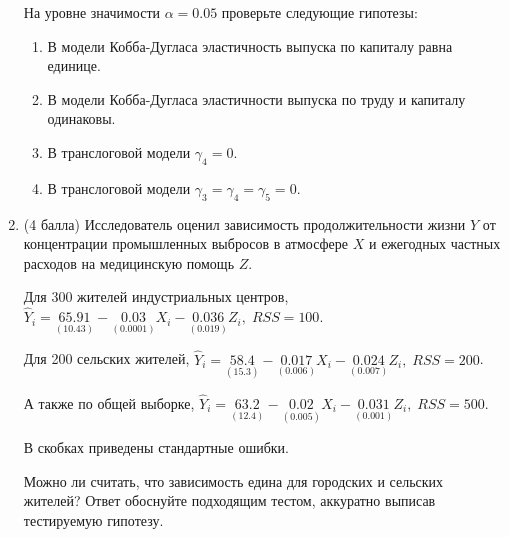 \documentclass[12pt]{article}
\theoremstyle{definition}
\begin{document}
\begin{enumerate}


На уровне значимости $\alpha = 0.05$ проверьте следующие гипотезы:
\begin{enumerate}
\item В модели Кобба-Дугласа эластичность выпуска по капиталу равна единице.
\item В модели Кобба-Дугласа эластичности выпуска по труду и капиталу одинаковы.
\item В транслоговой модели $\gamma_4=0$.
\item В транслоговой модели $\gamma_3 = \gamma_4 = \gamma_5 = 0$.
\end{enumerate}

\newpage
\item
(4 балла)
Исследователь оценил зависимость продолжительности жизни $Y$ от концентрации  промышленных выбросов в атмосфере $X$ и ежегодных частных расходов на медицинскую помощь $Z$.

Для 300 жителей индустриальных центров, $\hat{Y}_i = \underset{(10.43)}{65.91} - \underset{(0.0001)}{0.03}X_i - \underset{(0.019)}{0.036}Z_i, \; RSS = 100$.

Для 200 сельских жителей, $\hat{Y}_i = \underset{(15.3)}{58.4} - \underset{(0.006)}{0.017}X_i - \underset{(0.007)}{0.024}Z_i, \; RSS = 200$.

А также по общей выборке, $\hat{Y}_i = \underset{(12.4)}{63.2} - \underset{(0.005)}{0.02}X_i - \underset{(0.001)}{0.031}Z_i, \; RSS = 500$.

В скобках приведены стандартные ошибки.

Можно ли считать, что зависимость едина для городских и сельских жителей?
Ответ обоснуйте подходящим тестом, аккуратно выписав тестируемую гипотезу.
\newpage


\end{enumerate}
\end{document}
